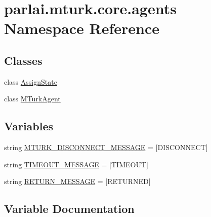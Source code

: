 \hypertarget{namespaceparlai_1_1mturk_1_1core_1_1agents}{}\section{parlai.\+mturk.\+core.\+agents Namespace Reference}
\label{namespaceparlai_1_1mturk_1_1core_1_1agents}
\subsection*{Classes}
\begin{DoxyCompactItemize}
\item 
class \hyperlink{classparlai_1_1mturk_1_1core_1_1agents_1_1AssignState}{Assign\+State}
\item 
class \hyperlink{classparlai_1_1mturk_1_1core_1_1agents_1_1MTurkAgent}{M\+Turk\+Agent}
\end{DoxyCompactItemize}
\subsection*{Variables}
\begin{DoxyCompactItemize}
\item 
string \hyperlink{namespaceparlai_1_1mturk_1_1core_1_1agents_a246ddb6db7d7232935ddea6350e02577}{M\+T\+U\+R\+K\+\_\+\+D\+I\+S\+C\+O\+N\+N\+E\+C\+T\+\_\+\+M\+E\+S\+S\+A\+GE} = \textquotesingle{}\mbox{[}D\+I\+S\+C\+O\+N\+N\+E\+CT\mbox{]}\textquotesingle{}
\item 
string \hyperlink{namespaceparlai_1_1mturk_1_1core_1_1agents_a78fb99836083c66ae48966650a81032b}{T\+I\+M\+E\+O\+U\+T\+\_\+\+M\+E\+S\+S\+A\+GE} = \textquotesingle{}\mbox{[}T\+I\+M\+E\+O\+UT\mbox{]}\textquotesingle{}
\item 
string \hyperlink{namespaceparlai_1_1mturk_1_1core_1_1agents_ab714f9cc5e4670ae87aef1b1d5531487}{R\+E\+T\+U\+R\+N\+\_\+\+M\+E\+S\+S\+A\+GE} = \textquotesingle{}\mbox{[}R\+E\+T\+U\+R\+N\+ED\mbox{]}\textquotesingle{}
\end{DoxyCompactItemize}


\subsection{Variable Documentation}
\mbox{\label{namespaceparlai_1_1mturk_1_1core_1_1agents_a246ddb6db7d7232935ddea6350e02577}} 
